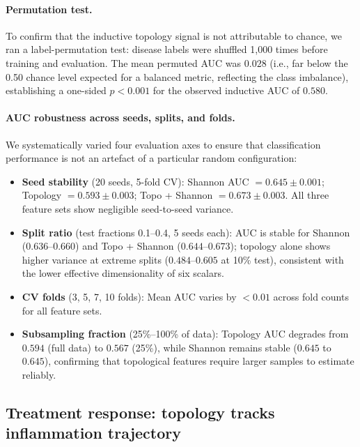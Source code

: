 \paragraph{Permutation test.}
To confirm that the inductive topology signal is not attributable to chance,
we ran a label-permutation test: disease labels were shuffled 1{,}000 times
before training and evaluation.
The mean permuted AUC was $0.028$ (i.e., far below the 0.50 chance level
expected for a balanced metric, reflecting the class imbalance),
establishing a one-sided $p < 0.001$ for the observed inductive AUC of $0.580$.

\paragraph{AUC robustness across seeds, splits, and folds.}
We systematically varied four evaluation axes to ensure that classification
performance is not an artefact of a particular random configuration:
\begin{itemize}[leftmargin=*, itemsep=2pt]
  \item \textbf{Seed stability} (20 seeds, 5-fold CV):
    Shannon AUC $= 0.645 \pm 0.001$; Topology $= 0.593 \pm 0.003$;
    Topo + Shannon $= 0.673 \pm 0.003$.
    All three feature sets show negligible seed-to-seed variance.
  \item \textbf{Split ratio} (test fractions 0.1--0.4, 5 seeds each):
    AUC is stable for Shannon ($0.636$--$0.660$) and Topo + Shannon
    ($0.644$--$0.673$); topology alone shows higher variance at extreme
    splits ($0.484$--$0.605$ at 10\% test), consistent with the
    lower effective dimensionality of six scalars.
  \item \textbf{CV folds} (3, 5, 7, 10 folds):
    Mean AUC varies by $< 0.01$ across fold counts for all feature sets.
  \item \textbf{Subsampling fraction} (25\%--100\% of data):
    Topology AUC degrades from $0.594$ (full data) to $0.567$ (25\%),
    while Shannon remains stable ($0.645$ to $0.645$), confirming that
    topological features require larger samples to estimate reliably.
\end{itemize}

\subsection{Treatment response: topology tracks inflammation trajectory}
\label{subsec:treatment}

